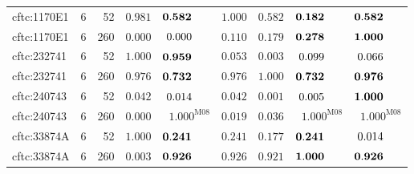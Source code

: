 \begin{longtable}{@{}lrrrrrrrr@{}}
cftc:1170E1 & 6 & 52 & $\mathbf{0.981}$ & $\mathbf{0.582}\hphantom{^{\mathrm{M00}}}$ & $\mathbf{1.000}$ & $\mathbf{0.582}$ & $\mathbf{0.182}\hphantom{^{\mathrm{M00}}}$ & $\mathbf{0.582}\hphantom{^{\mathrm{M00}}}$ \\
cftc:1170E1 & 6 & 260 & $0.000$ & $0.000\hphantom{^{\mathrm{M00}}}$ & $\mathbf{0.110}$ & $\mathbf{0.179}$ & $\mathbf{0.278}\hphantom{^{\mathrm{M00}}}$ & $\mathbf{1.000}\hphantom{^{\mathrm{M00}}}$ \\
cftc:232741 & 6 & 52 & $\mathbf{1.000}$ & $\mathbf{0.959}\hphantom{^{\mathrm{M00}}}$ & $0.053$ & $0.003$ & $0.099\hphantom{^{\mathrm{M00}}}$ & $0.066\hphantom{^{\mathrm{M00}}}$ \\
cftc:232741 & 6 & 260 & $\mathbf{0.976}$ & $\mathbf{0.732}\hphantom{^{\mathrm{M00}}}$ & $\mathbf{0.976}$ & $\mathbf{1.000}$ & $\mathbf{0.732}\hphantom{^{\mathrm{M00}}}$ & $\mathbf{0.976}\hphantom{^{\mathrm{M00}}}$ \\
cftc:240743 & 6 & 52 & $0.042$ & $0.014\hphantom{^{\mathrm{M00}}}$ & $0.042$ & $0.001$ & $0.005\hphantom{^{\mathrm{M00}}}$ & $\mathbf{1.000}\hphantom{^{\mathrm{M00}}}$ \\
cftc:240743 & 6 & 260 & $0.000$ & $\mathbf{1.000}^{\mathrm{M08}}$ & $0.019$ & $0.036$ & $\mathbf{1.000}^{\mathrm{M08}}$ & $\mathbf{1.000}^{\mathrm{M08}}$ \\
cftc:33874A & 6 & 52 & $\mathbf{1.000}$ & $\mathbf{0.241}\hphantom{^{\mathrm{M00}}}$ & $\mathbf{0.241}$ & $\mathbf{0.177}$ & $\mathbf{0.241}\hphantom{^{\mathrm{M00}}}$ & $0.014\hphantom{^{\mathrm{M00}}}$ \\
cftc:33874A & 6 & 260 & $0.003$ & $\mathbf{0.926}\hphantom{^{\mathrm{M00}}}$ & $\mathbf{0.926}$ & $\mathbf{0.921}$ & $\mathbf{1.000}\hphantom{^{\mathrm{M00}}}$ & $\mathbf{0.926}\hphantom{^{\mathrm{M00}}}$ \\
\end{longtable}

